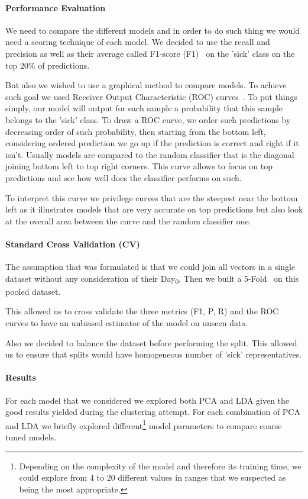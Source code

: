 \paragraph{Performance Evaluation}
We need to compare the different models and in order to do such thing we would need a scoring technique of each model. We decided to use the recall and precision  as well as their average called F1-score (F1)~\cite{wiki:f1} on the 'sick' class on the top 20\% of predictions. 

But also we wished to use a graphical method to compare models. To achieve such goal we used Receiver Output Characteristic (ROC) curves~\cite{wiki:roc}. To put things simply, our model will output for each sample a probability that this sample belongs to the 'sick' class. To draw a ROC curve, we order such predictions by decreasing order of such probability, then starting from the bottom left, considering ordered prediction we go up if the prediction is correct and right if it isn't. Usually models are compared to the random classifier that is the diagonal joining bottom left to top right corners. This curve allows to focus on top predictions and see how well does the classifier performs on such.

To interpret this curve we privilege curves that are the steepest near the bottom left as it illustrates models that are very accurate on top predictions but also look at the overall area between the curve and the random classifier one. 

\paragraph{Standard Cross Validation (CV)}
The assumption that was formulated is that we could join all vectors in a single dataset without any consideration of their Day\textsubscript{0}. Then we built a 5-Fold~\cite{wiki:cv} on this pooled dataset.  

This allowed us to cross validate the three metrics (F1, P, R) and the ROC curves to have an unbiased estimator of the model on unseen data. 

Also we decided to balance the dataset before performing the split. This allowed us to ensure that splits would have homogeneous number of 'sick' representatives. 

\paragraph{Results}
For each model that we considered we explored both PCA and LDA given the good results yielded during the clustering attempt. For each combination of PCA and LDA we briefly explored different\footnote{Depending on the complexity of the model and therefore its training time, we could explore from 4 to 20 different values in ranges that we suspected as being the most appropriate.} model parameters to compare coarse tuned models. 

